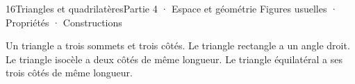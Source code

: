 \begin{ouverture}[geometrie]{16}{Triangles et quadrilatères}{Partie 4 · Espace et géométrie}
{Figures usuelles · Propriétés · Constructions}
\end{ouverture}
\pagestyle{otMain}\essentiel\fontsize{11}{15}\selectfont
{}\label{cours-16-1}
\begin{definition}Un triangle a trois sommets et trois côtés. Le triangle rectangle a un angle droit. Le triangle isocèle a deux côtés de même longueur. Le triangle équilatéral a ses trois côtés de même longueur.\end{definition}
\label{fig-cours-16-1-cours-triangles}

